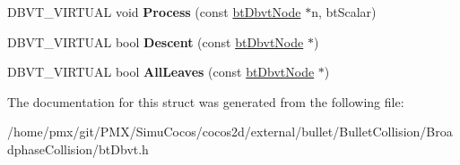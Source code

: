 \begin{DoxyCompactItemize}
\item 
\mbox{\label{structbtDbvt_1_1ICollide_a93fd4e1906d747ae6b5cfc29ed165c9d}} 
D\+B\+V\+T\+\_\+\+V\+I\+R\+T\+U\+AL void {\bfseries Process} (const \hyperlink{structbtDbvtNode}{bt\+Dbvt\+Node} $\ast$n, bt\+Scalar)
\item 
\mbox{\label{structbtDbvt_1_1ICollide_aad761bca654e99885bdd942df330ed9a}} 
D\+B\+V\+T\+\_\+\+V\+I\+R\+T\+U\+AL bool {\bfseries Descent} (const \hyperlink{structbtDbvtNode}{bt\+Dbvt\+Node} $\ast$)
\item 
\mbox{\label{structbtDbvt_1_1ICollide_a4a257177db9d370222d539479cc87749}} 
D\+B\+V\+T\+\_\+\+V\+I\+R\+T\+U\+AL bool {\bfseries All\+Leaves} (const \hyperlink{structbtDbvtNode}{bt\+Dbvt\+Node} $\ast$)
\end{DoxyCompactItemize}


The documentation for this struct was generated from the following file\+:\begin{DoxyCompactItemize}
\item 
/home/pmx/git/\+P\+M\+X/\+Simu\+Cocos/cocos2d/external/bullet/\+Bullet\+Collision/\+Broadphase\+Collision/bt\+Dbvt.\+h\end{DoxyCompactItemize}
